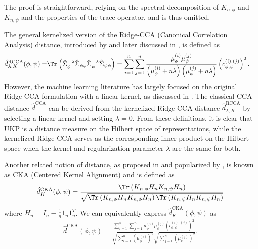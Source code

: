 \documentclass{article} %
\newcommand{\repone}{\phi}
\newcommand{\reptwo}{\psi}
\newcommand{\metricstname}{UKP }
\theoremstyle{plain}
\begin{document}
The proof is straightforward, relying on the spectral decomposition of $K_{n,\repone}$ and $K_{n,\reptwo}$ and the properties of the trace operator, and is thus omitted.

The general kernelized version of the Ridge-CCA (Canonical Correlation Analysis) distance, introduced by \citet{vinod1976canonical} and later discussed in \citet{kuss2003geometry}, is defined as
\[
\begin{aligned}
 \hat{d}^{\text{RCCA}}_{\lambda,K}(\repone,\reptwo) =& \Tr\left(\hat{\Sigma}_{\repone}^{-\lambda}\hat{\Sigma}_{\repone\reptwo}\hat{\Sigma}_{\reptwo}^{-\lambda}\hat{\Sigma}_{\reptwo\repone}\right) 
    = \sum_{i=1}^{n}\sum_{j=1}^{n}\frac{\mu_{\repone}^{(i)}\mu_{\reptwo}^{(j)}}{\left(\mu_{\repone}^{(i)} + n\lambda\right)\left(\mu_{\reptwo}^{(j)} + n\lambda\right)}\left(c_{\repone,\reptwo}^{(i),(j)} \right)^{2}.
\end{aligned}
\]
However, the machine learning literature has largely focused on the original Ridge-CCA formulation with a linear kernel, as discussed in \citet{kornblith2019similarity}. The classical CCA distance $\hat{d}^{\text{CCA}}$ can be derived from the kernelized Ridge-CCA distance $\hat{d}^{\text{RCCA}}_{\lambda,K}$ by selecting a linear kernel and setting $\lambda=0$. From these definitions, it is clear that \metricstname is a distance measure on the Hilbert space of representations, while the kernelized Ridge-CCA serves as the corresponding inner product on the Hilbert space when the kernel and regularization parameter $\lambda$ are the same for both.

Another related notion of distance, as proposed in \citet{cristianini2001kernel} and popularized  by \citet{kornblith2019similarity}, is known as CKA (Centered Kernel Alignment) and is defined as 
\[
\begin{aligned}
    \hat{d}_{K}^{\text{CKA}}(\repone,\reptwo) = \frac{\Tr\left(K_{n,\repone}H_{n}K_{n,\reptwo}H_{n}\right)}{\sqrt{\Tr\left(K_{n,\repone}H_{n}K_{n,\repone}H_{n}\right) \Tr\left(K_{n,\reptwo}H_{n}K_{n,\reptwo}H_{n}\right)}}
\end{aligned}
\]
where $H_{n} = I_{n} - \frac{1}{n}1_{n}1_{n}^{T}$. We can equivalently express $\hat{d}_{K}^{\text{CKA}}(\repone,\reptwo) $ as 
\[
\begin{aligned}
    \hat{d}^{\text{CKA}}(\repone,\reptwo) = \frac{\sum_{i=1}^{n}\sum_{j=1}^{n}\mu_{\repone}^{(i)}\mu_{\reptwo}^{(j)}\left(c_{\repone,\reptwo}^{(i),(j)} \right)^{2}}{\sqrt{\sum_{i=1}^{n} \left(\mu_{\repone}^{(i)}\right)^{2}}\sqrt{\sum_{j=1}^{n} \left(\mu_{\reptwo}^{(j)}\right)^{2}}}.
\end{aligned}
\]
\end{document}
